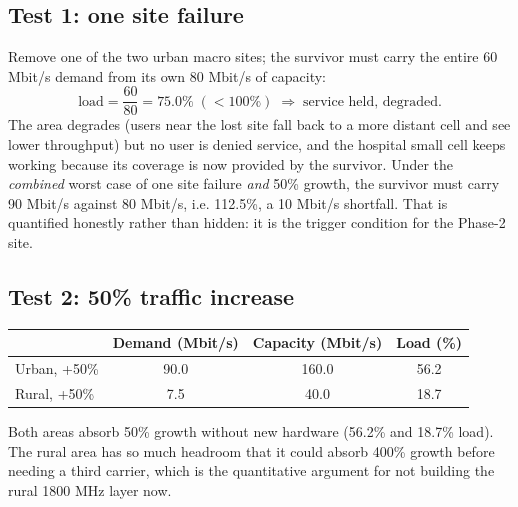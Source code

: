 \documentclass[9pt,a4paper]{article}
\begin{document}
\subsection{Test 1: one site failure}
Remove one of the two urban macro sites; the survivor must carry the entire 60 Mbit/s demand from
its own 80 Mbit/s of capacity:
\[
\text{load} = \frac{60}{80} = 75.0\% \;(<100\%) \;\Rightarrow\; \text{service held, degraded.}
\]
The area degrades (users near the lost site fall back to a more distant cell and see lower
throughput) but no user is denied service, and the hospital small cell keeps working because its
coverage is now provided by the survivor. Under the \emph{combined} worst case of one site failure
\emph{and} 50\% growth, the survivor must carry 90 Mbit/s against 80 Mbit/s, i.e. 112.5\%, a
10 Mbit/s shortfall. That is quantified honestly rather than hidden: it is the trigger condition
for the Phase-2 site.

\subsection{Test 2: 50\% traffic increase}
\begin{center}\small
\begin{tabular}{@{}lccc@{}}
\toprule
& Demand (Mbit/s) & Capacity (Mbit/s) & Load (\%) \\
\midrule
Urban, +50\% & 90.0 & 160.0 & 56.2 \\
Rural, +50\% & 7.5 & 40.0 & 18.7 \\
\bottomrule
\end{tabular}
\end{center}

Both areas absorb 50\% growth without new hardware (56.2\% and 18.7\% load). The rural area has so
much headroom that it could absorb 400\% growth before needing a third carrier, which is the
quantitative argument for not building the rural 1800 MHz layer now.
\end{document}

